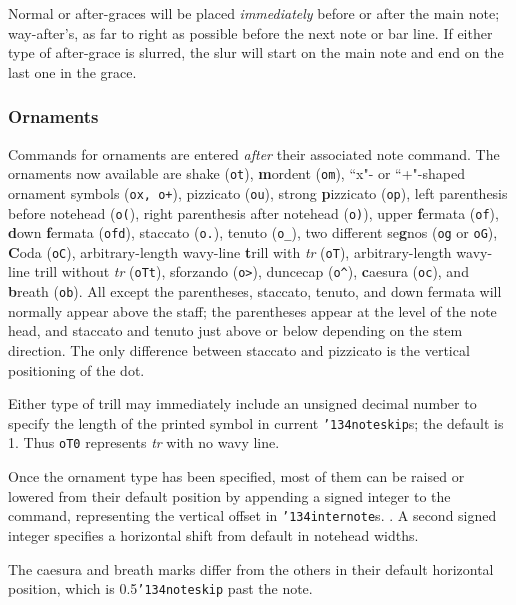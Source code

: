 \documentclass[11pt]{article}
\def\bs{{\tt\char'134}}
\def\newfrom{2.59}  %
\def\NEW#1{\ifdim#1 pt<\newfrom pt\else%
\marginpar{\fbox{#1}}\fi}
\begin{document}
	Normal or after-graces will be placed {\it immediately} before or after
the main note; way-after's, as far to right as possible before the next note 
or bar line.  If either type of after-grace is slurred, the slur will start 
on the main note and end on the last one in the grace.  
	

\subsubsection{Ornaments}

	Commands for ornaments are entered {\it after} their associated 
note command.  The ornaments now available are shake ({\tt ot}), {\bf m}ordent 
({\tt om}), ``x"- or ``+"-shaped ornament symbols ({\tt ox, o+}), pizzicato 
({\tt ou}), strong {\bf p}izzicato ({\tt op}), left parenthesis before
notehead ({\tt o(}), right parenthesis after notehead ({\tt o)}), 
upper {\bf f}ermata ({\tt of}), {\bf d}own {\bf f}ermata ({\tt ofd}), 
staccato ({\tt o.}), tenuto ({\tt o\_}), two different se{\bf g}nos 
({\tt og} or {\tt oG}), {\bf C}oda ({\tt oC})\NEW{2.71}, 
arbitrary-length wavy-line {\bf t}rill with {\it tr} ({\tt oT}), 
arbitrary-length wavy-line
trill without {\it tr} ({\tt oTt}), sforzando ({\tt o>}), 
duncecap ({\tt o\verb|^|}), \NEW{2.4}{\bf c}aesura ({\tt oc}), and 
{\bf b}reath ({\tt ob}).
All except the parentheses, staccato,
tenuto, and down fermata will normally 
appear above the staff; the parentheses appear at the level of the note 
head, and staccato and tenuto just above or below depending on the 
stem direction.  The only difference between staccato and 
pizzicato is the vertical positioning of the dot.

Either type of trill may immediately include an unsigned decimal number 
to specify the length of the printed symbol in current \bs{\tt noteskip}s; the 
default is 1. Thus {\tt oT0} represents {\it tr} with no wavy line.

Once the ornament type has been specified, most of them can be raised 
or lowered from their default position by appending
a signed integer to the command, representing the vertical offset
in \bs{\tt internote}s. \NEW{2.4}. A second signed integer specifies a 
horizontal shift from default in notehead widths.  

The caesura and breath marks differ from the others in their default horizontal position, 
which is 0.5\bs{\tt noteskip} past the note. 
\end{document}
